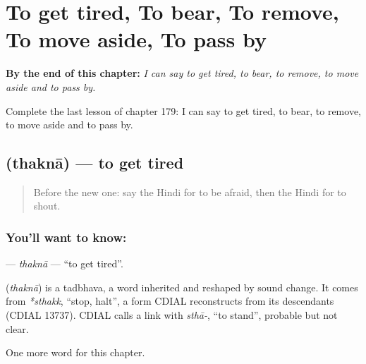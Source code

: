 
\chapter{To get tired, To bear, To remove, To move aside, To pass by}
\label{ch:hi-to-get-tired-to-bear-to-remove-to-move-aside-to-pass-by}

\begin{chapteropening}
\textbf{By the end of this chapter:} \emph{I can say to get tired, to bear, to remove, to move aside and to pass by.}

Complete the last lesson of chapter 179: I can say to get tired, to bear, to remove, to move aside and to pass by.
\end{chapteropening}

\section[\texorpdfstring{\hi{थकना} (thaknā)}{थकना (thaknā)}]{ (thaknā) — to get tired}

\label{lesson:HI-C179-thakna}



\begin{quote}
Before the new one: say the Hindi for to be afraid, then the Hindi for to shout.
\end{quote}

\subsection*{You'll want to know: }
\textbf{} — \emph{thaknā} — \textquotedblleft{}to get tired\textquotedblright{}.

\begin{cousinweb}
\textbf{} (\emph{thaknā}) is a tadbhava, a word inherited and reshaped by sound change. It comes from \emph{*sthakk}, \textquotedblleft{}stop, halt\textquotedblright{}, a form CDIAL reconstructs from its descendants (CDIAL 13737). CDIAL calls a link with \emph{sthā-}, \textquotedblleft{}to stand\textquotedblright{}, probable but not clear.
\end{cousinweb}

\begin{grammarlens}[title={What you've built}]
One more word for this chapter.
\end{grammarlens}


